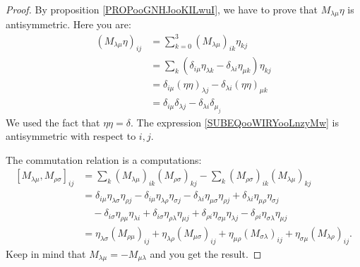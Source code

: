 \begin{proof}
	By proposition \ref{PROPooGNHJooKILwuI}, we have to prove that \( M_{\lambda\mu}\eta\) is antisymmetric. Here you are:
	\begin{subequations}
		\begin{align}
			(M_{\lambda\mu}\eta)_{ij} & =\sum_{k=0}^3(M_{\lambda\mu})_{ik}\eta_{kj}                                                        \\
			                          & =\sum_k(\delta_{i\mu}\eta_{\lambda k}-\delta_{\lambda i}\eta_{\mu k})\eta_{kj}                     \\
			                          & =\delta_{i\mu}(\eta\eta)_{\lambda j}-\delta_{\lambda i}(\eta\eta)_{\mu k}                          \\
			                          & =\delta_{i\mu}\delta_{\lambda j}-\delta_{\lambda i}\delta_{\mu_ j}     \label{SUBEQooWIRYooLnzyMw}
		\end{align}
	\end{subequations}
	We used the fact that \( \eta\eta=\delta\). The expression \eqref{SUBEQooWIRYooLnzyMw} is antisymmetric with respect to \( i,j\).

	The commutation relation is a computations:
	\begin{subequations}
		\begin{align}
			[M_{\lambda\mu},M_{\rho\sigma}]_{ij} & =\sum_k(M_{\lambda\mu})_{ik}(M_{\rho\sigma})_{kj}-\sum_k(M_{\rho\sigma})_{ik}(M_{\lambda\mu})_{kj}                                                            \\
			                                     & =\delta_{i\mu}\eta_{\lambda\sigma}\eta_{\rho j}-\delta_{i\mu}\eta_{\lambda\rho}\eta_{\sigma j}
			-\delta_{\lambda i}\eta_{\mu\sigma}\eta_{\rho j}+\delta_{\lambda i}\eta_{\mu\rho}\eta_{\sigma j}                                                                                                     \\
			                                     & \quad-\delta_{i\sigma}\eta_{\rho\mu}\eta_{\lambda i}+\delta_{i\sigma}\eta_{\rho\lambda}\eta_{\mu j}
			+\delta_{\rho i}\eta_{\sigma\mu}\eta_{\lambda j}-\delta_{\rho i}\eta_{\sigma\lambda}\eta_{\mu j}                                                                                                     \\
			                                     & =\eta_{\lambda\sigma}(M_{\rho\mu})_{ij}+\eta_{\lambda\rho}(M_{\mu\sigma})_{ij}+\eta_{\mu\rho}(M_{\sigma\lambda})_{ij}+\eta_{\sigma\mu}(M_{\lambda\rho})_{ij}.
		\end{align}
	\end{subequations}
	Keep in mind that \( M_{\lambda\mu}=-M_{\mu\lambda}\) and you get the result.
\end{proof}

